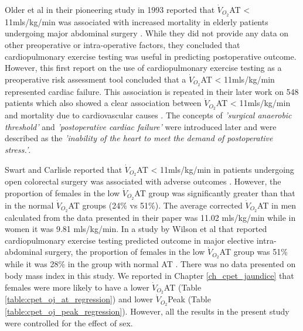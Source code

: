 Older et al in their pioneering study in 1993 reported that $\dot{V}_{O_2}$AT < 11mls/kg/min was associated with increased mortality in elderly patients undergoing major abdominal surgery \parencite{older_preoperative_1993}. While they did not provide any data on other preoperative or intra-operative factors, they concluded that cardiopulmonary exercise testing was useful in predicting postoperative outcome. However, this first report on the use of cardiopulmonary exercise testing as a preoperative risk assessment tool concluded that a $\dot{V}_{O_2}$AT < 11mls/kg/min represented cardiac failure. This association is repeated in their later work on 548 patients which also showed a clear association between $\dot{V}_{O_2}$AT < 11mls/kg/min and mortality due to cardiovascular causes \parencite{older_cardiopulmonary_1999}. The concepts of \textit{'surgical anaerobic threshold'} and \textit{'postoperative cardiac failure'} were introduced later and were described as the \textit{'inability of the heart to meet the demand of postoperative stress.'}\parencite{society_ats/accp_2003}.

Swart and Carlisle reported that $\dot{V}_{O_2}$AT < 11mls/kg/min in patients undergoing open colorectal surgery was associated with adverse outcomes \parencite{swart_case-controlled_2012}. However, the proportion of females in the low $\dot{V}_{O_2}$AT group was significantly greater than that in the normal $\dot{V}_{O_2}$AT groups (24\% vs 51\%). The average corrected $\dot{V}_{O_2}$AT in men calculated from the data presented in their paper was 11.02 mls/kg/min while in women it was 9.81 mls/kg/min. In a study by Wilson et al that reported cardiopulmonary exercise testing predicted outcome in major elective intra-abdominal surgery, the proportion of females in the low $\dot{V}_{O_2}$AT group was 51\% while it was 28\% in the group with normal AT \parencite{wilson_impaired_2010}. There was no data presented on body mass index in this study. We reported in Chapter \ref{ch_cpet_jaundice} that females were more likely to have a lower $\dot{V}_{O_2}$AT (Table \ref{table:cpet_oj_at_regression}) and lower $\dot{V}_{O_2}$Peak (Table \ref{table:cpet_oj_peak_regression}). However, all the results in the present study were controlled for the effect of sex. 

